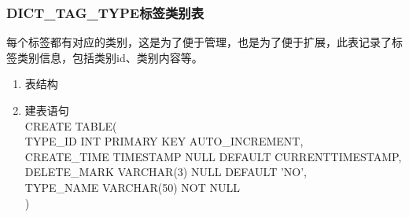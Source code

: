 \subsubsection{DICT\_TAG\_TYPE标签类别表}
每个标签都有对应的类别，这是为了便于管理，也是为了便于扩展，此表记录了标签类别信息，包括类别id、类别内容等。
\begin{enumerate}
    \item 表结构
    \begin{table}[htbp]
        \centering
        \end{table}
    \item 建表语句\\
        CREATE TABLE(\\
            TYPE\_ID INT PRIMARY KEY AUTO\_INCREMENT,\\
            CREATE\_TIME TIMESTAMP NULL DEFAULT CURRENTTIMESTAMP,\\
            DELETE\_MARK VARCHAR(3) NULL DEFAULT 'NO',\\
            TYPE\_NAME VARCHAR(50) NOT NULL\\
        )
    \end{enumerate}


